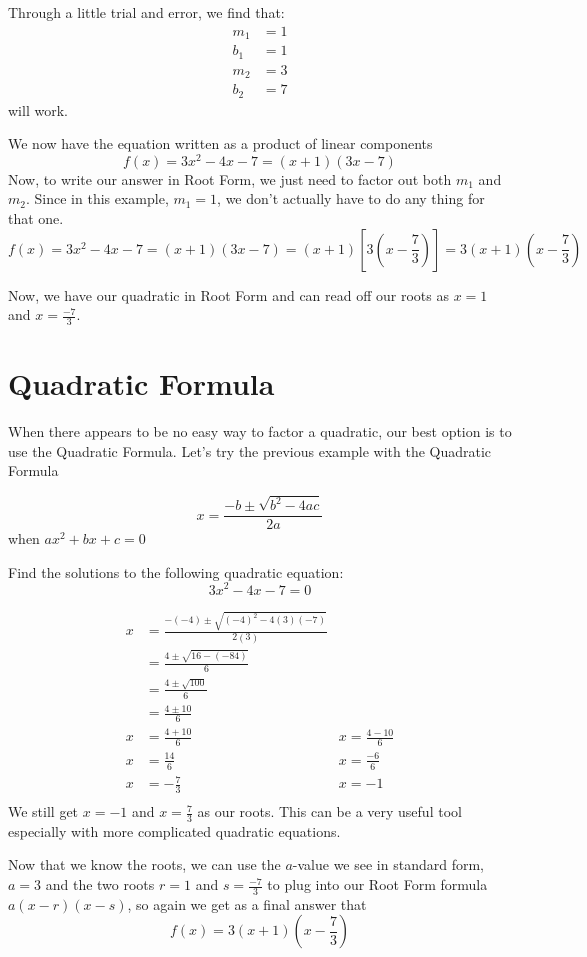 \documentclass{ximera}
\begin{document}
\begin{example}
\begin{explanation}
Through a little trial and error, we find that:
\begin{align*}
m_1&=1\\
b_1 &=1\\
m_2&=3\\
b_2&=7
\end{align*}
will work.

We now have the equation written as a product of linear components
\[
f(x)= 3x^2-4x-7=(x+1)(3x-7)
\]
Now, to write our answer in Root Form, we just need to factor out both $m_1$ and $m_2$.  Since in this example, $m_1=1$, we don't actually have to do any thing for that one.
\[
f(x)= 3x^2-4x-7=(x+1)(3x-7)=(x+1)\left[3\left(x-\frac{7}{3}\right)\right]=3(x+1)\left(x-\frac{7}{3}\right)
\]
\end{explanation}
Now, we have our quadratic in Root Form and can read off our roots as $x=1$ and $x=\frac{-7}{3}$.
\end{example}

\section{Quadratic Formula}
When there appears to be no easy way to factor a quadratic, our best option is to use the Quadratic Formula. Let's try the previous example with the Quadratic Formula
\begin{callout}
\[
x=\frac{-b\pm \sqrt{b^2-4ac}}{2a}
\]
when $ax^2+bx+c =0$
\end{callout}
\begin{example}
Find the solutions to the following quadratic equation:
\[
3x^2-4x-7=0
\]
\begin{explanation}
\begin{align*}
x&=\frac{-(-4)\pm \sqrt{(-4)^2-4(3)(-7)}}{2(3)}\\
&=\frac{4 \pm \sqrt{16-(-84)}}{6}\\
&=\frac{4 \pm \sqrt{100}}{6}\\
&=\frac{4 \pm 10}{6}\\
x&=\frac{4+10}{6}&x=\frac{4-10}{6}\\
x&=\frac{14}{6}&x=\frac{-6}{6}\\
x&=-\frac{7}{3}&x=-1\\
\end{align*}
We still get $x=-1$ and $x=\frac{7}{3}$ as our roots. This can be a very useful tool especially with more complicated quadratic equations.

Now that we know the roots, we can use the $a$-value we see in standard form, $a=3$ and the two roots $r=1$ and $s=\frac{-7}{3}$ to plug into our Root Form formula $a(x-r)(x-s)$, so again we get as a final answer that
\[
f(x)=3(x+1)\left(x-\frac{7}{3}\right)
\]
\end{explanation}
\end{example}
\end{document}
